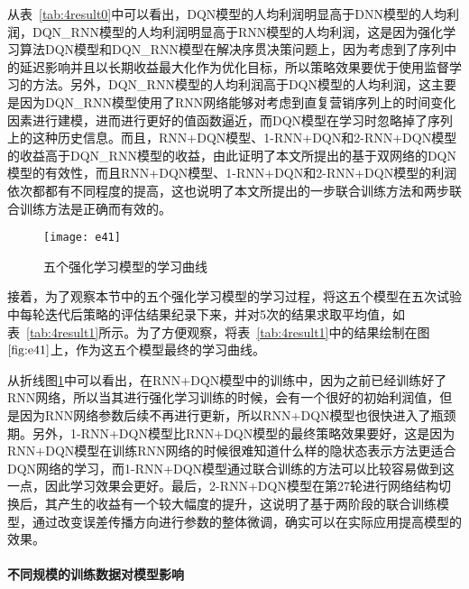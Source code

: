  从表~\ref{tab:4result0}中可以看出，DQN模型的人均利润明显高于DNN模型的人均利润，DQN_RNN模型的人均利润明显高于RNN模型的人均利润，这是因为强化学习算法DQN模型和DQN_RNN模型在解决序贯决策问题上，因为考虑到了序列中的延迟影响并且以长期收益最大化作为优化目标，所以策略效果要优于使用监督学习的方法。另外，DQN_RNN模型的人均利润高于DQN模型的人均利润，这主要是因为DQN_RNN模型使用了RNN网络能够对考虑到直复营销序列上的时间变化因素进行建模，进而进行更好的值函数逼近，而DQN模型在学习时忽略掉了序列上的这种历史信息。而且，RNN+DQN模型、1-RNN+DQN和2-RNN+DQN模型的收益高于DQN_RNN模型的收益，由此证明了本文所提出的基于双网络的DQN模型的有效性，而且RNN+DQN模型、1-RNN+DQN和2-RNN+DQN模型的利润依次都都有不同程度的提高，这也说明了本文所提出的一步联合训练方法和两步联合训练方法是正确而有效的。

 \begin{figure}[htbp]
\centering
\texttt{[image: e41]}
\caption{五个强化学习模型的学习曲线}
\label{fig:e41}
\end{figure}

接着，为了观察本节中的五个强化学习模型的学习过程，将这五个模型在五次试验中每轮迭代后策略的评估结果纪录下来，并对5次的结果求取平均值，如表~\ref{tab:4result1}所示。为了方便观察，将表~\ref{tab:4result1}中的结果绘制在图$\ref{fig:e41}$上，作为这五个模型最终的学习曲线。

从折线图\ref{fig:e41}中可以看出，在RNN+DQN模型中的训练中，因为之前已经训练好了RNN网络，所以当其进行强化学习训练的时候，会有一个很好的初始利润值，但是因为RNN网络参数后续不再进行更新，所以RNN+DQN模型也很快进入了瓶颈期。另外，1-RNN+DQN模型比RNN+DQN模型的最终策略效果要好，这是因为RNN+DQN模型在训练RNN网络的时候很难知道什么样的隐状态表示方法更适合DQN网络的学习，而1-RNN+DQN模型通过联合训练的方法可以比较容易做到这一点，因此学习效果会更好。最后，2-RNN+DQN模型在第27轮进行网络结构切换后，其产生的收益有一个较大幅度的提升，这说明了基于两阶段的联合训练模型，通过改变误差传播方向进行参数的整体微调，确实可以在实际应用提高模型的效果。


\paragraph{不同规模的训练数据对模型影响}


